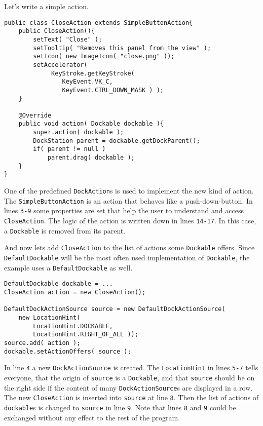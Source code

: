 \documentclass[a4paper,10pt]{article}
\newcommand{\src}[1]{\lstinline[basicstyle=\normalsize\ttfamily,keywordstyle=\normalsize\ttfamily,identifierstyle=\normalsize\ttfamily]|#1|}
\begin{document}
Let's write a simple action.
\begin{lstlisting}
public class CloseAction extends SimpleButtonAction{
	public CloseAction(){
		setText( "Close" );
		setTooltip( "Removes this panel from the view" );
		setIcon( new ImageIcon( "close.png" ));
		setAccelerator(
			 KeyStroke.getKeyStroke(
				KeyEvent.VK_C,
				KeyEvent.CTRL_DOWN_MASK ) );
	}

	@Override
	public void action( Dockable dockable ){
		super.action( dockable );
		DockStation parent = dockable.getDockParent();
		if( parent != null )
			parent.drag( dockable );
	}
}
\end{lstlisting}
One of the predefined \src{DockAction}s is used to implement the new kind of action. The \src{SimpleButtonAction} is an action that behaves like a push-down-button. In lines \src{3-9} some properties are set that help the user to understand and access \src{CloseAction}. The logic of the action is written down in lines \src{14-17}. In this case, a \src{Dockable} is removed from its parent.

And now lets add \src{CloseAction} to the list of actions some \src{Dockable} offers. Since \src{DefaultDockable} will be the most often used implementation of \src{Dockable}, the example uses a \src{DefaultDockable} as well.
\begin{lstlisting}
DefaultDockable dockable = ...
CloseAction action = new CloseAction();

DefaultDockActionSource source = new DefaultDockActionSource(
	new LocationHint(
		LocationHint.DOCKABLE, 
		LocationHint.RIGHT_OF_ALL ));
source.add( action );
dockable.setActionOffers( source );
\end{lstlisting}
In line \src{4} a new \src{DockActionSource} is created. The \src{LocationHint} in lines \src{5-7} tells everyone, that the origin of \src{source} is a \src{Dockable}, and that \src{source} should be on the right side if the content of many \src{DockActionSource}s are displayed in a row. The new \src{CloseAction} is inserted into \src{source} at line \src{8}. Then the list of actions of \src{dockable}s is changed to \src{source} in line \src{9}. Note that lines \src{8} and \src{9} could be exchanged without any effect to the rest of the program.
\end{document}

